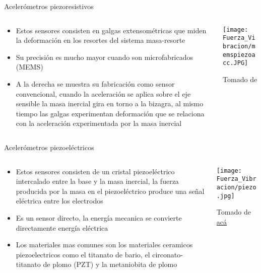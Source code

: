 \documentclass[aspectratio=169]{beamer}
\begin{document}
\begin{frame}{Acelerómetros piezoresistivos}
    \begin{columns}[c, onlytextwidth]
        \begin{column}{0.65\textwidth}
            \begin{itemize}
                \item Estos sensores consisten en galgas extensométricas que miden la deformación en los resortes del sistema masa-resorte
                \item Su precisión es mucho mayor cuando son microfabricados (MEMS)
                \item A la derecha se muestra su fabricación como sensor convencional, cuando la aceleración se aplica sobre el eje sensible la masa inercial gira en torno a la bizagra, al mismo tiempo las galgas experimentan deformación que se relaciona con la aceleración experimentada por la masa inercial
            \end{itemize}
        \end{column}
        \begin{column}{0.35\textwidth}
            \centering
            \texttt{[image: Fuerza\_Vibracion/memspiezoacc.JPG]}
            
            \tiny{Tomado de \cite{Fraden_2016}}
        \end{column}
    \end{columns}
\end{frame}

\begin{frame}{Acelerómetros piezoeléctricos}
    \begin{columns}[c, onlytextwidth]
        \begin{column}{0.6\textwidth}
            \begin{itemize}
                \item Estos sensores consisten de un cristal piezoeléctrico intercalado entre la base y la masa inercial, la fuerza producida por la masa en el piezoeléctrico produce una señal eléctrica entre los electrodos
                \item Es un sensor directo, la energía mecanica se convierte directamente energía eléctrica
                \item Los materiales mas comunes son los materiales ceramicos piezoelectricos como el titanato de bario, el circonato-titanato de plomo (PZT) y la metaniobita de plomo
            \end{itemize}
        \end{column}
        \begin{column}{0.4\textwidth}
            \centering
            \texttt{[image: Fuerza\_Vibracion/piezo.jpg]}
            
            \tiny{Tomado de \href{www.instrumentationtoday.com}{acá}}
        \end{column}
    \end{columns}
\end{frame}
\end{document}
